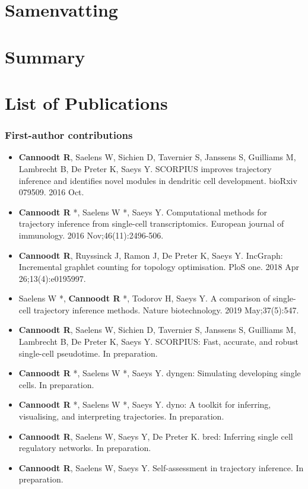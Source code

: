 \appendix


\backmatter


\chapter{Samenvatting}

\chapter{Summary}

\chapter{List of Publications}

\subsection{First-author contributions}

\begin{itemize}
	\item \textbf{Cannoodt R}, Saelens W, Sichien D, Tavernier S, Janssens S, Guilliams M, Lambrecht B, De Preter K, Saeys Y. SCORPIUS improves trajectory inference and identifies novel modules in dendritic cell development. bioRxiv 079509. 2016 Oct.
	\item \textbf{Cannoodt R} *, Saelens W *, Saeys Y. Computational methods for trajectory inference from single-cell transcriptomics. European journal of immunology. 2016 Nov;46(11):2496-506.
	\item \textbf{Cannoodt R}, Ruyssinck J, Ramon J, De Preter K, Saeys Y. IncGraph: Incremental graphlet counting for topology optimisation. PloS one. 2018 Apr 26;13(4):e0195997.
	\item Saelens W *, \textbf{Cannoodt R} *, Todorov H, Saeys Y. A comparison of single-cell trajectory inference methods. Nature biotechnology. 2019 May;37(5):547.
	\item \textbf{Cannoodt R}, Saelens W, Sichien D, Tavernier S, Janssens S, Guilliams M, Lambrecht B, De Preter K, Saeys Y. SCORPIUS: Fast, accurate, and robust single-cell pseudotime. In preparation.
	\item \textbf{Cannoodt R} *, Saelens W *, Saeys Y. dyngen: Simulating developing single cells. In preparation.
	\item \textbf{Cannoodt R} *, Saelens W *, Saeys Y. dyno: A toolkit for inferring, visualising, and interpreting trajectories. In preparation.
	\item \textbf{Cannoodt R}, Saelens W, Saeys Y, De Preter K. bred: Inferring single cell regulatory networks. In preparation. 
	\item \textbf{Cannoodt R}, Saelens W, Saeys Y. Self-assessment in trajectory inference. In preparation.
\end{itemize}

